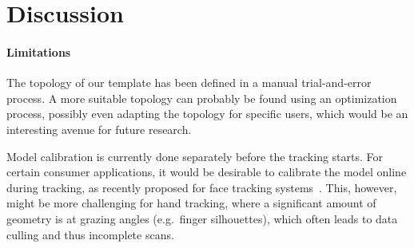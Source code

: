 

\section{Discussion}
\label{sec:discussion}



\paragraph{Limitations}


The topology of our template has been defined in a manual trial-and-error process. A more suitable topology can probably be found using an optimization process, possibly even adapting the topology for specific users, which would be an interesting avenue for future research.

Model calibration is currently done separately before the tracking starts. For certain consumer applications, it would be desirable to calibrate the model online during tracking, as recently proposed for face tracking systems~\cite{sofien, others}. This, however, might be more challenging for hand tracking, where a significant amount of geometry is at grazing angles (e.g.\ finger silhouettes), which often leads to data culling and thus incomplete scans.




